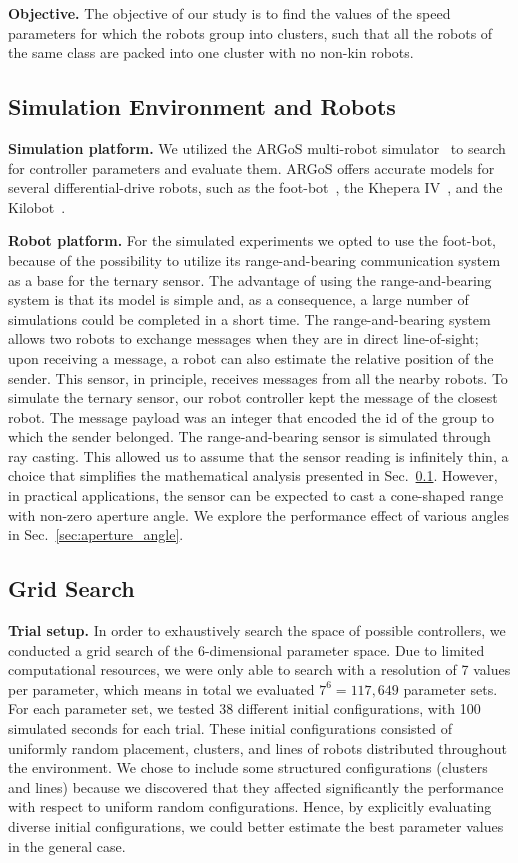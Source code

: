 \documentclass[conference]{IEEEtran}
\newcommand{\myparagraph}[1]{\textbf{#1.}}
\begin{document}
\myparagraph{Objective}
The objective of our study is to find the values of the speed parameters for
which the robots group into clusters, such that all the robots of the same class
are packed into one cluster with no non-kin robots.

\subsection{Simulation Environment and Robots}

\myparagraph{Simulation platform}
We utilized the ARGoS multi-robot simulator~\cite{pinciroli_argos:_2012} to
search for controller parameters and evaluate them. ARGoS offers accurate models
for several differential-drive robots, such as the foot-bot~\cite{}, the Khepera
IV~\cite{}, and the Kilobot~\cite{}.

\myparagraph{Robot platform}
For the simulated experiments we opted to use the foot-bot, because of the
possibility to utilize its range-and-bearing communication system as a base for
the ternary sensor. The advantage of using the range-and-bearing system is that
its model is simple and, as a consequence, a large number of simulations could
be completed in a short time. The range-and-bearing system allows two robots to
exchange messages when they are in direct line-of-sight; upon receiving a
message, a robot can also estimate the relative position of the sender. This
sensor, in principle, receives messages from all the nearby robots. To simulate
the ternary sensor, our robot controller kept the message of the closest
robot. The message payload was an integer that encoded the id of the group to
which the sender belonged. The range-and-bearing sensor is simulated through ray
casting. This allowed us to assume that the sensor reading is infinitely thin, a
choice that simplifies the mathematical analysis presented in
Sec.~\ref{}. However, in practical applications, the sensor can be expected to
cast a cone-shaped range with non-zero aperture angle. We explore the
performance effect of various angles in Sec.~\ref{sec:aperture_angle}.

\subsection{Grid Search}
\label{sec:gridsearch}
  
\myparagraph{Trial setup}
In order to exhaustively search the space of possible controllers, we conducted
a grid search of the 6-dimensional parameter space. Due to limited computational
resources, we were only able to search with a resolution of 7 values per
parameter, which means in total we evaluated $7^6=117,649$ parameter sets. For
each parameter set, we tested 38 different initial configurations, with 100
simulated seconds for each trial. These initial configurations consisted of
uniformly random placement, clusters, and lines of robots distributed throughout
the environment. We chose to include some structured configurations (clusters
and lines) because we discovered that they affected significantly the
performance with respect to uniform random configurations. Hence, by explicitly
evaluating diverse initial configurations, we could better estimate the best
parameter values in the general case.
\end{document}
